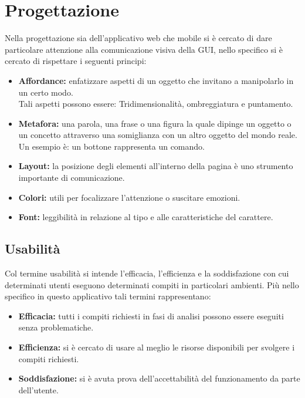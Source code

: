 \documentclass[a4paper,final,12pt]{report}
\begin{document}
\section{Progettazione}
Nella progettazione sia dell'applicativo web che mobile si è cercato di dare particolare attenzione alla comunicazione visiva della GUI, nello specifico si è cercato di rispettare i seguenti principi:
\begin{itemize}
\item \textbf{Affordance:} enfatizzare aspetti di un oggetto che invitano a manipolarlo in un certo modo.\\ Tali aspetti possono essere: Tridimensionalità, ombreggiatura e puntamento.
\item \textbf{Metafora:} una parola, una frase o una figura la quale dipinge un oggetto o un concetto attraverso una somiglianza con un altro oggetto del mondo reale. Un esempio è: un bottone rappresenta un comando.
\item \textbf{Layout:} 
la posizione degli elementi all'interno della pagina è uno strumento importante di comunicazione.
\item \textbf{Colori:} utili per focalizzare l'attenzione o suscitare emozioni.
\item \textbf{Font:} leggibilità in relazione al tipo e alle caratteristiche del carattere.
\end{itemize}

\subsection{Usabilità}
Col termine usabilità si intende l'efficacia, l'efficienza e la soddisfazione con cui determinati utenti eseguono determinati compiti in particolari ambienti. 
Più nello specifico in questo applicativo tali termini rappresentano:
\begin{itemize}
\item \textbf{Efficacia:} tutti i compiti richiesti in fasi di analisi possono essere eseguiti senza problematiche.
\item \textbf{Efficienza:} si è cercato di usare al meglio le risorse disponibili per svolgere i compiti richiesti.
\item \textbf{Soddisfazione:} si è avuta prova dell'accettabilità del funzionamento da parte dell'utente.
\end{itemize}
\end{document}
